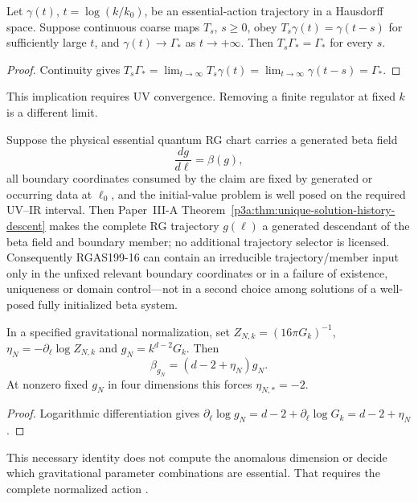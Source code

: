 \documentclass[12pt,a4paper]{article}
\begin{document}
\begin{proposition}
\label{p12:prop:v199-rgas-uv-limit}
Let \(\gamma(t)\), \(t=\log(k/k_0)\), be an essential-action trajectory
in a Hausdorff space.  Suppose continuous coarse maps \(T_s\), \(s\ge0\),
obey \(T_s\gamma(t)=\gamma(t-s)\) for sufficiently large \(t\), and
\(\gamma(t)\to\Gamma_*\) as \(t\to+\infty\).  Then
\(T_s\Gamma_*=\Gamma_*\) for every \(s\).
\end{proposition}
\begin{proof}
Continuity gives
\(T_s\Gamma_*=\lim_{t\to\infty}T_s\gamma(t)
=\lim_{t\to\infty}\gamma(t-s)=\Gamma_*\).
\end{proof}
This implication requires UV convergence.  Removing a finite regulator
at fixed \(k\) is a different limit.

\begin{corollary}
\label{p12:cor:rg-trajectory-unique-descendant}
Suppose the physical essential quantum RG chart carries a generated beta field
\[
 \frac{dg}{d\ell}=\beta(g),
\]
all boundary coordinates consumed by the claim are fixed by generated or
occurring data at $\ell_0$, and the initial-value problem is well posed on the
required UV--IR interval.  Then Paper~III-A
Theorem~\ref{p3a:thm:unique-solution-history-descent} makes the complete RG
trajectory $g(\ell)$ a generated descendant of the beta field and boundary
member; no additional trajectory selector is licensed.  Consequently
RGAS199-16 can contain an irreducible trajectory/member input only in the
unfixed relevant boundary coordinates or in a failure of existence,
uniqueness or domain control---not in a second choice among solutions of a
well-posed fully initialized beta system.
\end{corollary}

\begin{proposition}
\label{p12:prop:v199-rgas-newton}
In a specified gravitational normalization, set
\(Z_{N,k}=(16\pi G_k)^{-1}\), \(\eta_N=-\partial_\ell\log Z_{N,k}\)
and \(g_N=k^{d-2}G_k\).  Then
\begin{equation}
\label{p12:eq:v199-rgas-newton}
 \beta_{g_N}=(d-2+\eta_N)g_N .
\end{equation}
At nonzero fixed \(g_N\) in four dimensions this forces
\(\eta_{N,*}=-2\).
\end{proposition}
\begin{proof}
Logarithmic differentiation gives
\(\partial_\ell\log g_N=d-2+\partial_\ell\log G_k=d-2+\eta_N\).
\end{proof}
This necessary identity does not compute the anomalous dimension or
decide which gravitational parameter combinations are essential.
That requires the complete normalized action
\cite{BaldazziFalls2021EssentialQEG}.
\end{document}
